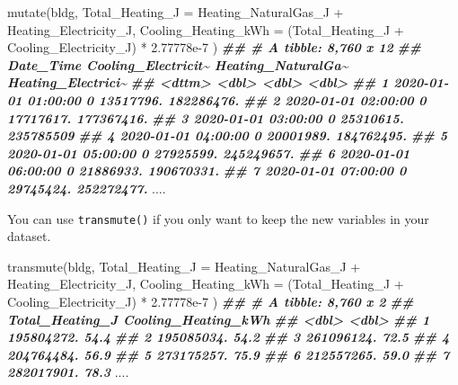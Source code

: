 \documentclass[
]{book}
\newenvironment{Shaded}{\begin{snugshade}}{\end{snugshade}}
\newcommand{\AttributeTok}[1]{\textcolor[rgb]{0.77,0.63,0.00}{#1}}
\newcommand{\DocumentationTok}[1]{\textcolor[rgb]{0.56,0.35,0.01}{\textbf{\textit{#1}}}}
\newcommand{\FloatTok}[1]{\textcolor[rgb]{0.00,0.00,0.81}{#1}}
\newcommand{\FunctionTok}[1]{\textcolor[rgb]{0.00,0.00,0.00}{#1}}
\newcommand{\NormalTok}[1]{#1}
\newcommand{\SpecialCharTok}[1]{\textcolor[rgb]{0.00,0.00,0.00}{#1}}
\begin{document}
\begin{Shaded}
\begin{Highlighting}[]
\FunctionTok{mutate}\NormalTok{(bldg,}
  \AttributeTok{Total\_Heating\_J =}\NormalTok{ Heating\_NaturalGas\_J }\SpecialCharTok{+}\NormalTok{ Heating\_Electricity\_J,}
  \AttributeTok{Cooling\_Heating\_kWh =}\NormalTok{ (Total\_Heating\_J }\SpecialCharTok{+}\NormalTok{ Cooling\_Electricity\_J) }\SpecialCharTok{*} \FloatTok{2.77778e{-}7}
\NormalTok{)}
\DocumentationTok{\#\# \# A tibble: 8,760 x 12}
\DocumentationTok{\#\#    Date\_Time           Cooling\_Electricit\textasciitilde{} Heating\_NaturalGa\textasciitilde{} Heating\_Electrici\textasciitilde{}}
\DocumentationTok{\#\#    \textless{}dttm\textgreater{}                            \textless{}dbl\textgreater{}              \textless{}dbl\textgreater{}              \textless{}dbl\textgreater{}}
\DocumentationTok{\#\#  1 2020{-}01{-}01 01:00:00                   0          13517796.         182286476.}
\DocumentationTok{\#\#  2 2020{-}01{-}01 02:00:00                   0          17717617.         177367416.}
\DocumentationTok{\#\#  3 2020{-}01{-}01 03:00:00                   0          25310615.         235785509 }
\DocumentationTok{\#\#  4 2020{-}01{-}01 04:00:00                   0          20001989.         184762495.}
\DocumentationTok{\#\#  5 2020{-}01{-}01 05:00:00                   0          27925599.         245249657.}
\DocumentationTok{\#\#  6 2020{-}01{-}01 06:00:00                   0          21886933.         190670331.}
\DocumentationTok{\#\#  7 2020{-}01{-}01 07:00:00                   0          29745424.         252272477.}
\NormalTok{....}
\end{Highlighting}
\end{Shaded}

You can use \texttt{transmute()} if you only want to keep the new variables in your dataset.

\begin{Shaded}
\begin{Highlighting}[]
\FunctionTok{transmute}\NormalTok{(bldg,}
  \AttributeTok{Total\_Heating\_J =}\NormalTok{ Heating\_NaturalGas\_J }\SpecialCharTok{+}\NormalTok{ Heating\_Electricity\_J,}
  \AttributeTok{Cooling\_Heating\_kWh =}\NormalTok{ (Total\_Heating\_J }\SpecialCharTok{+}\NormalTok{ Cooling\_Electricity\_J) }\SpecialCharTok{*} \FloatTok{2.77778e{-}7}
\NormalTok{)}
\DocumentationTok{\#\# \# A tibble: 8,760 x 2}
\DocumentationTok{\#\#    Total\_Heating\_J Cooling\_Heating\_kWh}
\DocumentationTok{\#\#              \textless{}dbl\textgreater{}               \textless{}dbl\textgreater{}}
\DocumentationTok{\#\#  1      195804272.                54.4}
\DocumentationTok{\#\#  2      195085034.                54.2}
\DocumentationTok{\#\#  3      261096124.                72.5}
\DocumentationTok{\#\#  4      204764484.                56.9}
\DocumentationTok{\#\#  5      273175257.                75.9}
\DocumentationTok{\#\#  6      212557265.                59.0}
\DocumentationTok{\#\#  7      282017901.                78.3}
\NormalTok{....}
\end{Highlighting}
\end{Shaded}
\end{document}
